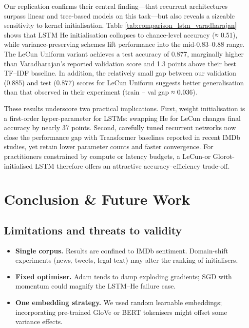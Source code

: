 \documentclass[conference]{IEEEtran}
\begin{document}
Our replication confirms their central finding—that recurrent architectures surpass linear and tree-based models on this task—but also reveals a sizeable sensitivity to kernel initialisation.  Table \ref{tab:comparison_lstm_varadharajan} shows that LSTM He initialisation collapses to chance-level accuracy (≈ 0.51), while variance-preserving schemes lift performance into the mid-0.83–0.88 range.  The LeCun Uniform variant achieves a test accuracy of 0.877, marginally higher than Varadharajan’s reported validation score and 1.3 points above their best TF–IDF baseline.  In addition, the relatively small gap between our validation (0.885) and test (0.877) scores for LeCun Uniform suggests better generalisation than that observed in their experiment (train – val gap ≈ 0.036).

These results underscore two practical implications.  First, weight initialisation is a first-order hyper-parameter for LSTMs: swapping He for LeCun changes final accuracy by nearly 37 points.  Second, carefully tuned recurrent networks now close the performance gap with Transformer baselines reported in recent IMDb studies, yet retain lower parameter counts and faster convergence.  For practitioners constrained by compute or latency budgets, a LeCun-or Glorot-initialised LSTM therefore offers an attractive accuracy–efficiency trade-off. 





\section*{Conclusion \& Future Work}\label{sec:conclusion}

\subsection{Limitations and threats to validity}

\begin{itemize}
  \item \textbf{Single corpus.}  Results are confined to IMDb sentiment.
        Domain-shift experiments (news, tweets, legal text) may alter the
        ranking of initialisers.
  \item \textbf{Fixed optimiser.}  Adam tends to damp exploding gradients;
        SGD with momentum could magnify the LSTM–He failure case.
  \item \textbf{One embedding strategy.}  We used random learnable
        embeddings; incorporating pre-trained GloVe or BERT tokenisers might
        offset some variance effects.
\end{itemize}
\end{document}
